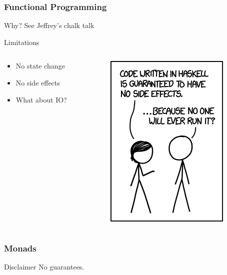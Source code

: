 \begin{frame}
    \frametitle{Functional Programming}
    \begin{block}{Why?}
        See Jeffrey's chalk talk
    \end{block}
    \begin{block}{Limitations}
        \begin{columns}
            \begin{column}{0.5\textwidth}
                \begin{itemize}
                    \item No state change
                    \item No side effects
                    \item What about IO?
                \end{itemize}
            \end{column}
            \begin{column}{0.5\textwidth}
                \includegraphics[scale=0.5]{images/xkcd}
            \end{column}
        \end{columns}
    \end{block}
\end{frame}
\begin{frame}
    \frametitle{Monads}
    \begin{block}{Disclaimer}
        No guarantees.
    \end{block}
\end{frame}
